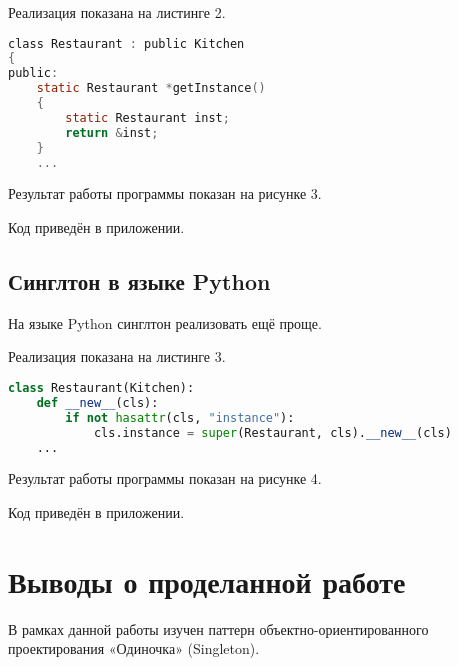 Реализация показана на листинге 2.

\begin{lstlisting}[language=c, caption={Cинглтон Мейера}, lineskip={0pt}]
class Restaurant : public Kitchen
{
public:
    static Restaurant *getInstance()
    {
        static Restaurant inst;
        return &inst;
    }
    ...
\end{lstlisting}

Результат работы программы показан на рисунке 3.

Код приведён в приложении.
\FloatBarrier


\subsection{Синглтон в языке Python}
На языке Python синглтон реализовать ещё проще. 

Реализация показана на листинге 3.

\begin{lstlisting}[language=python, caption={Cинглтон в Python}, lineskip={0pt}]
class Restaurant(Kitchen):
    def __new__(cls):
        if not hasattr(cls, "instance"):
            cls.instance = super(Restaurant, cls).__new__(cls)
    ...
\end{lstlisting}

Результат работы программы показан на рисунке 4.

Код приведён в приложении.


\FloatBarrier
\clearpage

\section{Выводы о проделанной работе}
В рамках данной работы изучен паттерн объектно-ориентированного проектирования «Одиночка» (Singleton).

\clearpage